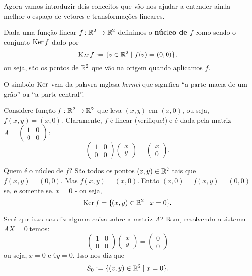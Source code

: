 Agora vamos introduzir dois conceitos que vão nos ajudar a entender ainda melhor o espaço de vetores e transformações lineares.

\begin{df}
	Dada uma função linear $f:\mathbb R^2\to \mathbb R^2$ definimos o \textbf{núcleo de $f$} como sendo o conjunto $\operatorname{Ker} f$ dado por
	\[\operatorname{Ker} f:=\{v\in \mathbb R^2\mid f(v)=(0,0)\},\]ou seja, são os pontos de $\mathbb R^2$ que vão na origem quando aplicamos $f$.
\end{df}

\begin{rmk}
	O símbolo $\operatorname{Ker}$ vem da palavra inglesa \emph{kernel} que significa ``a parte macia de um grão'' ou ``a parte central''.
\end{rmk}

\begin{ex}
	Considere função $f:\mathbb R^2\to\mathbb R^2$ que leva $(x,y)$ em $(x,0)$, ou seja, $f(x,y)=(x,0)$. Claramente, $f$ é linear (verifique!) e é dada pela matriz $A=\begin{pmatrix}
	1&0\\0&0
	\end{pmatrix}$:
	\[\begin{pmatrix}
	1&0\\0&0
	\end{pmatrix}\begin{pmatrix}
	x\\y
	\end{pmatrix}=\begin{pmatrix}
	x\\0
	\end{pmatrix}.\]
	
	Quem é o núcleo de $f$? São todos os pontos $(x,y)\in \mathbb R^2$ tais que $f(x,y)=(0,0)$. Mas $f(x,y)=(x,0)$. Então $(x,0)=f(x,y)=(0,0)$ se, e somente se, $x=0$ -  ou seja,
	\[\operatorname{Ker} f=\{(x,y)\in \mathbb R^2\mid x=0\}.\]
	
	Será que isso nos diz alguma coisa sobre a matriz $A$? Bom, resolvendo o sistema $AX=0$ temos:
	\[\begin{pmatrix}
	1&0\\0&0
	\end{pmatrix}\begin{pmatrix}
	x\\y
	\end{pmatrix}=\begin{pmatrix}
	0\\0
	\end{pmatrix}\]ou seja, $x=0$ e $0y=0$. Isso nos diz que
	\[S_0:=\{(x,y)\in\mathbb R^2\mid x=0\}.\]
	

\end{ex}
